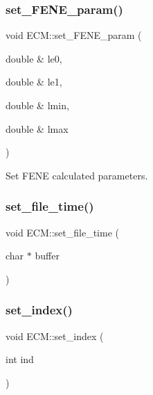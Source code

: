 \subsubsection{\texorpdfstring{set\_FENE\_param()}{set\_FENE\_param()}}
{\footnotesize\ttfamily void E\+C\+M\+::set\+\_\+\+F\+E\+N\+E\+\_\+param (\begin{DoxyParamCaption}\item[{double \&}]{le0,  }\item[{double \&}]{le1,  }\item[{double \&}]{lmin,  }\item[{double \&}]{lmax }\end{DoxyParamCaption})\hspace{0.3cm}{\ttfamily [inline]}}

Set F\+E\+NE calculated parameters. \mbox{\label{classECM_ae637a880979bf8ea181b09b41a575fd1}} 
\subsubsection{\texorpdfstring{set\_file\_time()}{set\_file\_time()}}
{\footnotesize\ttfamily void E\+C\+M\+::set\+\_\+file\+\_\+time (\begin{DoxyParamCaption}\item[{char $\ast$}]{buffer }\end{DoxyParamCaption})\hspace{0.3cm}{\ttfamily [inline]}}

\mbox{\label{classECM_a78e54e27714f2ed310b75296eaba5495}} 
\subsubsection{\texorpdfstring{set\_index()}{set\_index()}}
{\footnotesize\ttfamily void E\+C\+M\+::set\+\_\+index (\begin{DoxyParamCaption}\item[{int}]{ind }\end{DoxyParamCaption})\hspace{0.3cm}{\ttfamily [inline]}}

\mbox{\label{classECM_a9c4ea9febf2771ef222cd1430c3bf136}} 
